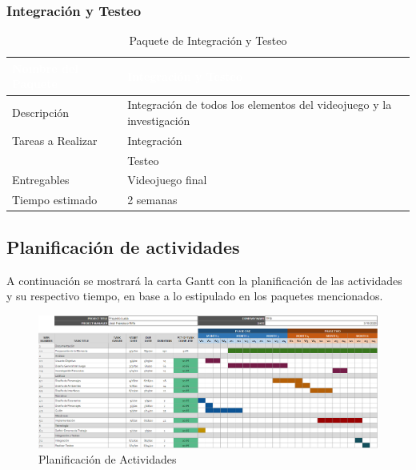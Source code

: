 \subsubsection{Integración y Testeo}
\begin{table}[h!]
    \centering
    \begin{tabular}{|l|p{10cm}|}
        \hline
        \rowcolor{Aqua}
        \textcolor{white}{\textbf{Nombre del Paquete}} & \textcolor{white}{\textbf{Integración y Testeo}}\\
        \hline
        \rowcolor{Light Aqua}
        Descripción & Integración de todos los elementos del videojuego y la investigación\\
        \hline
        \rowcolor{Light Aqua}
        Tareas a Realizar & Integración\\
        \rowcolor{Light Aqua}
        & Testeo\\
        \hline
        \rowcolor{Light Aqua}
        Entregables & Videojuego final\\
        \hline
        \rowcolor{Light Aqua}
        Tiempo estimado & 2 semanas\\
        \hline
    \end{tabular}
    \caption{Paquete de Integración y Testeo}
    \label{tab:paquete-integracion}
\end{table}

\subsection{Planificación de actividades}
A continuación se mostrará la carta Gantt con la planificación de las actividades y su respectivo tiempo, en base a lo estipulado en los paquetes mencionados.

\begin{figure}
    \centering
    \includegraphics[width=\textwidth]{imgs/gantt.png}
    \caption{Planificación de Actividades}
    \label{fig:gantt}
\end{figure}

